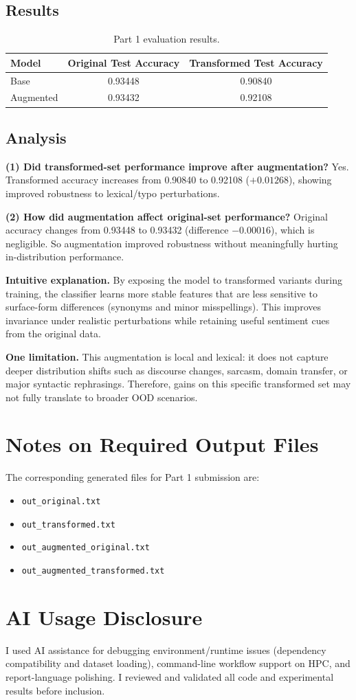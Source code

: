 \documentclass[11pt]{article}
\begin{document}
\subsection*{Results}
\begin{table}[h]
\centering
\begin{tabular}{lcc}
\toprule
Model & Original Test Accuracy & Transformed Test Accuracy \\
\midrule
Base & 0.93448 & 0.90840 \\
Augmented & 0.93432 & 0.92108 \\
\bottomrule
\end{tabular}
\caption{Part 1 evaluation results.}
\end{table}

\subsection*{Analysis}
\textbf{(1) Did transformed-set performance improve after augmentation?} Yes.
Transformed accuracy increases from 0.90840 to 0.92108 ($+0.01268$), showing improved robustness to lexical/typo perturbations.

\textbf{(2) How did augmentation affect original-set performance?}
Original accuracy changes from 0.93448 to 0.93432 (difference $-0.00016$), which is negligible. So augmentation improved robustness without meaningfully hurting in-distribution performance.

\textbf{Intuitive explanation.}
By exposing the model to transformed variants during training, the classifier learns more stable features that are less sensitive to surface-form differences (synonyms and minor misspellings). This improves invariance under realistic perturbations while retaining useful sentiment cues from the original data.

\textbf{One limitation.}
This augmentation is local and lexical: it does not capture deeper distribution shifts such as discourse changes, sarcasm, domain transfer, or major syntactic rephrasings. Therefore, gains on this specific transformed set may not fully translate to broader OOD scenarios.

\section*{Notes on Required Output Files}
The corresponding generated files for Part 1 submission are:
\begin{itemize}
	\item \texttt{out\_original.txt}
	\item \texttt{out\_transformed.txt}
	\item \texttt{out\_augmented\_original.txt}
	\item \texttt{out\_augmented\_transformed.txt}
\end{itemize}

\section*{AI Usage Disclosure}
I used AI assistance for debugging environment/runtime issues (dependency compatibility and dataset loading), command-line workflow support on HPC, and report-language polishing. I reviewed and validated all code and experimental results before inclusion.
\end{document}
